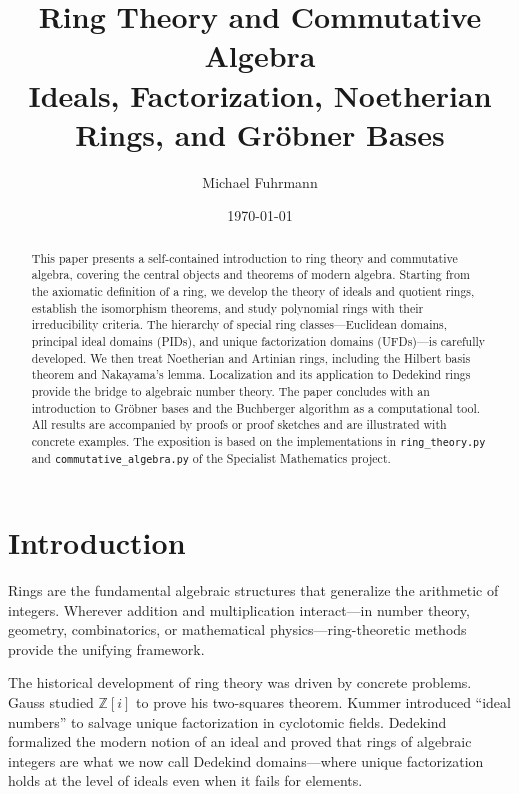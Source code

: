 \documentclass[12pt,a4paper]{amsart}
\title{Ring Theory and Commutative Algebra\\
\large Ideals, Factorization, Noetherian Rings, and Gröbner Bases}
\author{Michael Fuhrmann}
\date{\today}
\theoremstyle{definition}
\theoremstyle{definition}
\begin{document}
\begin{abstract}
This paper presents a self-contained introduction to ring theory and commutative
algebra, covering the central objects and theorems of modern algebra.
Starting from the axiomatic definition of a ring, we develop the theory of ideals
and quotient rings, establish the isomorphism theorems, and study polynomial rings
with their irreducibility criteria. The hierarchy of special ring classes---Euclidean
domains, principal ideal domains (PIDs), and unique factorization domains (UFDs)---is
carefully developed. We then treat Noetherian and Artinian rings, including the
Hilbert basis theorem and Nakayama's lemma. Localization and its application to
Dedekind rings provide the bridge to algebraic number theory. The paper concludes
with an introduction to Gröbner bases and the Buchberger algorithm as a
computational tool. All results are accompanied by proofs or proof sketches and
are illustrated with concrete examples. The exposition is based on the
implementations in \texttt{ring\_theory.py} and \texttt{commutative\_algebra.py}
of the Specialist Mathematics project.
\end{abstract}

\maketitle
\tableofcontents

\section{Introduction}

Rings are the fundamental algebraic structures that generalize the arithmetic of
integers. Wherever addition and multiplication interact---in number theory, geometry,
combinatorics, or mathematical physics---ring-theoretic methods provide the
unifying framework.

The historical development of ring theory was driven by concrete problems.
Gauss studied $\mathbb{Z}[i]$ to prove his two-squares theorem. Kummer introduced
``ideal numbers'' to salvage unique factorization in cyclotomic fields. Dedekind
formalized the modern notion of an ideal and proved that rings of algebraic integers
are what we now call Dedekind domains---where unique factorization holds at the
level of ideals even when it fails for elements.
\end{document}
